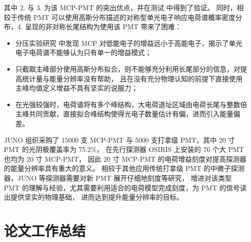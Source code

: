 其中 2. 与 3. 为该 MCP-PMT 的突出优点，并在测试\cite{zhangPerformanceEvaluation8inch2023} 中得到了验证。
同时，相较于传统 PMT 可以使用高斯分布描述的对称型单光电子响应电荷谱概率密度分布，4. 呈现的非对称长尾结构为使用该 PMT 带来了困难：
\begin{itemize}
    \item 分压实验研究\cite{yangMCPPerformanceImprovement2017} 中发现 MCP 对低能电子的增益远小于高能电子，揭示了单光电子电荷谱不能够认为只有单一的增益模式；
    \item 只截取主峰部分使用高斯分布拟合，则不能够充分利用长尾部分的信息，对提高统计量与能量分辨率没有帮助，
    且在没有充分物理认知的前提下直接使用主峰均值定义增益不具有坚实的说服力；
    \item 在光强较强时，电荷谱将有多个峰结构，大电荷道址区域由电荷长尾与整数倍主峰共同贡献，直接拟合峰结构使得光电子数量估计有偏，进而引入能量偏差。
\end{itemize}

JUNO 组织采购了 15000 支 MCP-PMT 与 5000 支打拿级 PMT，其中 20 寸 PMT 的光阴极覆盖率为 75.2\%，
在先行探测器 OSIRIS 上安装的 76 个大 PMT 也均为 20 寸 MCP-PMT，
因此 20 寸 MCP-PMT 的电荷增益刻度对提高探测器的能量分辨率具有重大的意义。
相较于其他应用传统打拿级 PMT 的中微子探测器，JUNO 等探测器需要对新 PMT 展开仔细地刻度等研究，
增进对该类型 PMT 的理解与经验，尤其需要利用适合的电荷模型完成刻度，为 PMT 的信号读出提供坚实的物理基础，
进而达到提升能量分辨率的目标。

\section{论文工作总结}

